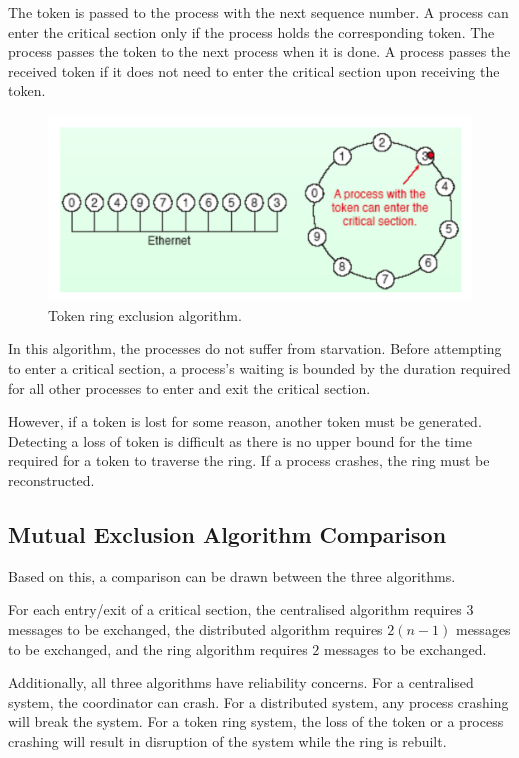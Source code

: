 The token is passed to the process with the next sequence number. A process can enter the critical section only if the process holds the corresponding token. The process passes the token to the next process when it is done. A process passes the received token if it does not need to enter the critical section upon receiving the token. 

\begin{figure}
\centering
\includegraphics[width=0.7\linewidth]{screenshot035}
\caption{Token ring exclusion algorithm.}
\label{fig:screenshot035}
\end{figure}

In this algorithm, the processes do not suffer from starvation. Before attempting to enter a critical section, a process's waiting is bounded by the duration required for all other processes to enter and exit the critical section.

However, if a token is lost for some reason, another token must be generated. Detecting a loss of token is difficult as there is no upper bound for the time required for a token to traverse the ring. If a process crashes, the ring must be reconstructed.

\subsection{Mutual Exclusion Algorithm Comparison}
Based on this, a comparison can be drawn between the three algorithms.

For each entry/exit of a critical section, the centralised algorithm requires $3$ messages to be exchanged, the distributed algorithm requires $2(n-1)$ messages to be exchanged, and the ring algorithm requires $2$ messages to be exchanged.

Additionally, all three algorithms have reliability concerns. For a centralised system, the coordinator can crash. For a distributed system, any process crashing will break the system. For a token ring system, the loss of the token or a process crashing will result in disruption of the system while the ring is rebuilt.

